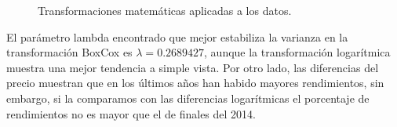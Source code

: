 \begin{figure}[!h]
	\centering
	\qquad
	\qquad
	\qquad
	\caption{Transformaciones matemáticas aplicadas a los datos.}
	\label{fig20}
\end{figure}

El parámetro lambda encontrado que mejor estabiliza la varianza en la transformación BoxCox es $\lambda = 0.2689427$, aunque la transformación logarítmica muestra una mejor tendencia a simple vista. Por otro lado, las diferencias del precio muestran que en los últimos años han habido mayores rendimientos, sin embargo, si la comparamos con las diferencias logarítmicas el porcentaje de rendimientos no es mayor que el de finales del 2014. 

